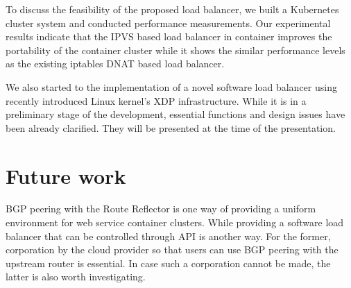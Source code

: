 To discuss the feasibility of the proposed load balancer, we built
a Kubernetes cluster system and conducted performance measurements.
Our experimental results indicate that the IPVS based load balancer in container improves the portability of
the container cluster while it shows the similar performance levels as the existing iptables DNAT based load balancer.

We also started to the implementation of a novel software load balancer using recently introduced Linux kernel's XDP infrastructure.
While it is in a preliminary stage of the development, essential functions and design issues have been already clarified.
They will be presented at the time of the presentation.

\section{Future work}\label{Future work}

BGP peering with the Route Reflector is one way of providing a uniform environment for web service container clusters.
While providing a software load balancer that can be controlled through API is another way.
For the former, corporation by the cloud provider so that users can use BGP peering with the upstream router is essential.
In case such a corporation cannot be made, the latter is also worth investigating.


